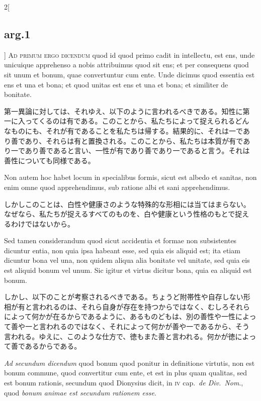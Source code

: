 \documentclass[paper=a4paper,fontsize=10pt,jafontsize=9pt,titlepage]{jlreq}
\begin{document}
\begin{paracol}{2}[\subsection{arg.1}]
{\scshape Ad primum ergo dicendum} quod id quod primo cadit in
intellectu, est ens, unde unicuique apprehenso a nobis attribuimus
quod sit ens; et per consequens quod sit unum et bonum, quae
convertuntur cum ente. Unde dicimus quod essentia est ens et una et
bona; et quod unitas est ens et una et bona; et similiter de bonitate.

\switchcolumn

第一異論に対しては、それゆえ、以下のように言われるべきである。知性に第
一に入ってくるのは有である。このことから、私たちによって捉えられるどん
なものにも、それが有であることを私たちは帰する。結果的に、それは一であ
り善であり、それらは有と置換される。このことから、私たちは本質が有であ
り一であり善であると言い、一性が有であり善であり一であると言う。それは
善性についても同様である。

\switchcolumn*

Non autem hoc habet locum in specialibus formis, sicut est albedo et
sanitas, non enim omne quod apprehendimus, sub ratione albi et sani
apprehendimus.

\switchcolumn

しかしこのことは、白性や健康さのような特殊的な形相には当てはまらない。
なぜなら、私たちが捉えるすべてのものを、白や健康という性格のもとで捉え
るわけではないから。

\switchcolumn*

Sed tamen considerandum quod sicut accidentia et formae
non subsistentes dicuntur entia, non quia ipsa habeant esse, sed quia
eis aliquid est; ita etiam dicuntur bona vel una, non quidem aliqua
alia bonitate vel unitate, sed quia eis est aliquid bonum vel
unum. Sic igitur et virtus dicitur bona, quia ea aliquid est bonum.

\switchcolumn

しかし、以下のことが考察されるべきである。ちょうど附帯性や自存しない形
相が有と言われるのは、それら自身が存在を持つからではなく、むしろそれら
によって何かが在るからであるように、あるものどもは、別の善性や一性によっ
て善や一と言われるのではなく、それによって何かが善や一であるから、そう
言われる。ゆえに、このような仕方で、徳もまた善と言われる。何かが徳によっ
て善であるからである。

\switchcolumn*[\subsection{ad.2}]

{\itshape Ad secundum dicendum} quod bonum quod ponitur in definitione
virtutis, non est bonum commune, quod convertitur cum ente, et est in
plus quam qualitas, sed est bonum rationis, secundum quod Dionysius
dicit, in {\scshape iv} cap.~{\itshape de Div.~Nom}., quod {\itshape
bonum animae est secundum rationem esse}.


\end{paracol}
\end{document}
